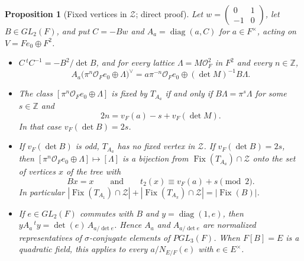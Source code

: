 \documentclass[12pt,letterpaper]{amsart}
\numberwithin{equation}{section}
\newtheorem{proposition}[theorem]{Proposition}
\theoremstyle{definition}
\theoremstyle{plain}
\newcommand{\smat}[4]{\left(\begin{smallmatrix}#1&#2\\#3&#4\end{smallmatrix}\right)}
\begin{document}
\begin{proposition}[Fixed vertices in $\mathcal Z$; direct proof]
\label{prop:new-Zfix}
Let $w=\smat{0}{1}{-1}{0}$, let $B\in GL_2(F)$, and put $C=-Bw$ and
$A_a=\operatorname{diag}(a,C)$ for $a\in F^\times$, acting on
$V=Fe_0\oplus F^2$.
\begin{itemize}
\item[(a)] $C\,{}^tC^{-1}=-B^2/\det B$, and for every lattice
$\Lambda=M\mathcal O_F^2$ in $F^2$ and every $n\in\mathbb Z$,
\[
 A_a\bigl(\pi^n\mathcal O_Fe_0\oplus\Lambda\bigr)^\vee
 =a\pi^{-n}\mathcal O_Fe_0\oplus(\det M)^{-1}B\Lambda .
\]
\item[(b)] The class $[\pi^n\mathcal O_Fe_0\oplus\Lambda]$ is fixed by
$T_{A_a}$ if and only if $B\Lambda=\pi^s\Lambda$ for some
$s\in\mathbb Z$ and
\[
 2n=v_F(a)-s+v_F(\det M).
\]
In that case $v_F(\det B)=2s$.
\item[(c)] If $v_F(\det B)$ is odd, $T_{A_a}$ has no fixed vertex in
$\mathcal Z$. If $v_F(\det B)=2s$, then
$[\pi^n\mathcal O_Fe_0\oplus\Lambda]\mapsto[\Lambda]$ is a bijection
from $\operatorname{Fix}(T_{A_a})\cap\mathcal Z$ onto the set of
vertices $x$ of the tree with
\[
 Bx=x\qquad\text{and}\qquad t_2(x)\equiv v_F(a)+s\pmod 2 .
\]
In particular
$|\operatorname{Fix}(T_{A_1})\cap\mathcal Z|
+|\operatorname{Fix}(T_{A_\pi})\cap\mathcal Z|
=|\operatorname{Fix}(B)|$.
\item[(d)] If $e\in GL_2(F)$ commutes with $B$ and
$y=\operatorname{diag}(1,e)$, then
$yA_a\,{}^ty=\det(e)\,A_{a/\det e}$. Hence $A_a$ and $A_{a/\det e}$
are normalized representatives of $\sigma$-conjugate elements of
$PGL_3(F)$. When $F[B]=E$ is a quadratic field, this applies to every
$a/N_{E/F}(e)$ with $e\in E^\times$.
\end{itemize}
\end{proposition}
\end{document}
